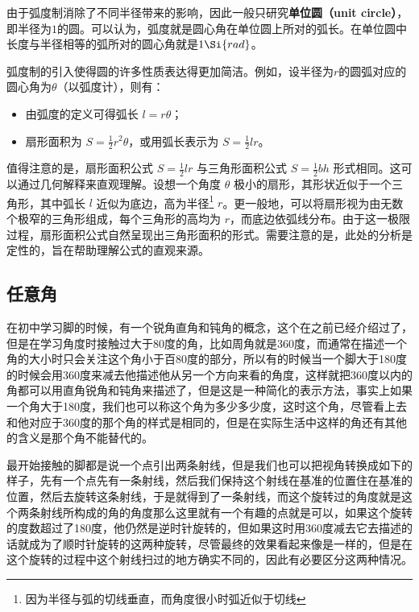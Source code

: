 由于弧度制消除了不同半径带来的影响，因此一般只研究\textbf{单位圆（unit circle）}，即半径为$1$的圆。可以认为，弧度就是圆心角在单位圆上所对的弧长。在单位圆中长度与半径相等的弧所对的圆心角就是$1 \Si{rad}$。

弧度制的引入使得圆的许多性质表达得更加简洁。例如，设半径为$r$的圆弧对应的圆心角为$\theta$（以弧度计），则有：
\begin{itemize}
\item 由弧度的定义可得弧长 $l = r\theta$；
\item 扇形面积为 $\displaystyle S = \frac{1}{2} r^2 \theta$，或用弧长表示为 $\displaystyle S = \frac{1}{2} l r$。
\end{itemize}

值得注意的是，扇形面积公式 $\displaystyle S = \frac{1}{2} l r$ 与三角形面积公式 $\displaystyle S = \frac{1}{2} bh$ 形式相同。这可以通过几何解释来直观理解。设想一个角度 $\theta$ 极小的扇形，其形状近似于一个三角形，其中弧长 $l$ 近似为底边，高为半径\footnote{因为半径与弧的切线垂直，而角度很小时弧近似于切线} $r$。更一般地，可以将扇形视为由无数个极窄的三角形组成，每个三角形的高均为 $r$，而底边依弧线分布。由于这一极限过程，扇形面积公式自然呈现出三角形面积的形式。需要注意的是，此处的分析是定性的，旨在帮助理解公式的直观来源。


\subsection{任意角}

在初中学习脚的时候，有一个锐角直角和钝角的概念，这个在之前已经介绍过了，但是在学习角度时接触过大于80度的角，比如周角就是360度，而通常在描述一个角的大小时只会关注这个角小于百80度的部分，所以有的时候当一个脚大于180度的时候会用360度来减去他描述他从另一个方向来看的角度，这样就把360度以内的角都可以用直角锐角和钝角来描述了，但是这是一种简化的表示方法，事实上如果一个角大于180度，我们也可以称这个角为多少多少度，这时这个角，尽管看上去和他对应于360度的那个角的样式是相同的，但是在实际生活中这样的角还有其他的含义是那个角不能替代的。

最开始接触的脚都是说一个点引出两条射线，但是我们也可以把视角转换成如下的样子，先有一个点先有一条射线，然后我们保持这个射线在基准的位置住在基准的位置，然后去旋转这条射线，于是就得到了一条射线，而这个旋转过的角度就是这个两条射线所构成的角的角度那么这里就有一个有趣的点就是可以，如果这个旋转的度数超过了180度，他仍然是逆时针旋转的，但如果这时用360度减去它去描述的话就成为了顺时针旋转的这两种旋转，尽管最终的效果看起来像是一样的，但是在这个旋转的过程中这个射线扫过的地方确实不同的，因此有必要区分这两种情况。

